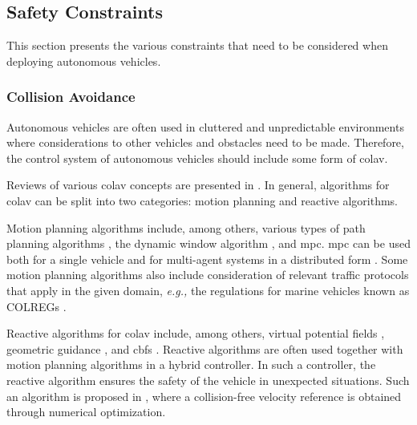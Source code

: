 \subsection{Safety Constraints}
\label{sec:introduction_safety}

This section presents the various constraints that need to be considered when deploying autonomous vehicles.

\subsubsection{Collision Avoidance}
Autonomous vehicles are often used in cluttered and unpredictable environments where considerations to other vehicles and obstacles need to be made. 
Therefore, the control system of autonomous vehicles should include some form of \gls{colav}.

Reviews of various \gls{colav} concepts are presented in \cite{statheros_autonomous_2008,tam_review_2009,hoy_algorithms_2015}.
In general, algorithms for \gls{colav} can be split into two categories: motion planning and reactive algorithms.

Motion planning algorithms include, among others, various types of path planning algorithms \cite{wang_ship_2017,kuwata_safe_2014,chiang_colreg-rrt_2018,lazarowska_ships_2015}, the dynamic window algorithm \cite{fox_dynamic_1997}, and \gls{mpc}.
\gls{mpc} can be used both for a single vehicle \cite{hagen_mpc-based_2018,sun_collision_2018} and for multi-agent systems in a distributed form \cite{kuriki_formation_2015,dai_distributed_2017}.
Some motion planning algorithms also include consideration of relevant traffic protocols that apply in the given domain, \emph{e.g.,} the regulations for marine vehicles known as COLREGs \cite{wang_ship_2017,kuwata_safe_2014,chiang_colreg-rrt_2018}.

Reactive algorithms for \gls{colav} include, among others, virtual potential fields \cite{roussos_3d_2008}, geometric guidance \cite{mujumdar_reactive_2011}, and \glspl{cbf} \cite{squires_constructive_2018,igarashi_collision_2018,romdlony_stabilization_2016,basso_safety-critical_2020,ames_control_2014}.
Reactive algorithms are often used together with motion planning algorithms in a hybrid controller.
In such a controller, the reactive algorithm ensures the safety of the vehicle in unexpected situations.
Such an algorithm is proposed in \cite{hedjar_automatic_2019}, where a collision-free velocity reference is obtained through numerical optimization.

